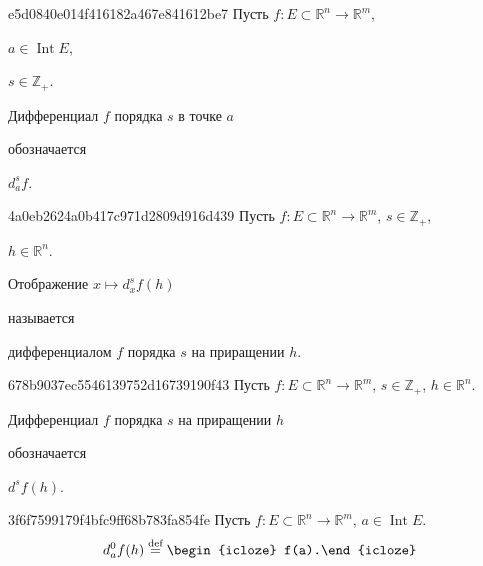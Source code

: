 \begin{note}{e5d0840e014f416182a467e841612be7}
    Пусть \({ f : E \subset \mathbb R^{n} \to \mathbb R^{m} }\),\: \begin{icloze}{4}\({ a \in \operatorname{Int} E }\),\end{icloze}\: \begin{icloze}{3}\({ s \in \mathbb Z_+ }\).\end{icloze}
    \begin{icloze}{1}Дифференциал \({ f }\) порядка \({ s }\) в точке \({ a }\)\end{icloze} обозначается \begin{icloze}{2}\({ d_{a}^{s}f }\).\end{icloze}
\end{note}

\begin{note}{4a0eb2624a0b417c971d2809d916d439}
    Пусть \({ f : E \subset \mathbb R^{n} \to \mathbb R^{m} }\),\: \({ s \in \mathbb Z_+ }\),\: \begin{icloze}{3}\({ h \in \mathbb R^{n} }\).\end{icloze}
    \begin{icloze}{1}Отображение \({ x \mapsto d_{x}^{s}f(h) }\)\end{icloze} называется \begin{icloze}{2}дифференциалом \({ f }\) порядка \({ s }\) на приращении \({ h }\).\end{icloze}
\end{note}

\begin{note}{678b9037ec5546139752d16739190f43}
    Пусть \({ f : E \subset \mathbb R^{n} \to \mathbb R^{m} }\),\: \({ s \in \mathbb Z_+ }\),\: \({ h \in \mathbb R^{n} }\).
    \begin{icloze}{1}Дифференциал \({ f }\) порядка \({ s }\) на приращении \({ h }\)\end{icloze} обозначается \begin{icloze}{2}\({ d^{s}f(h) }\).\end{icloze}
\end{note}

\begin{note}{3f6f7599179f4bfc9ff68b783fa854fe}
    Пусть \({ f : E \subset \mathbb R^{n} \to \mathbb R^{m} }\),\: \({ a \in \operatorname{Int} E }\).
    \[
        d_{a}^{0}f(h) \overset{\text{def}}= \begin{icloze}{1}f(a).\end{icloze}
    \]
\end{note}

